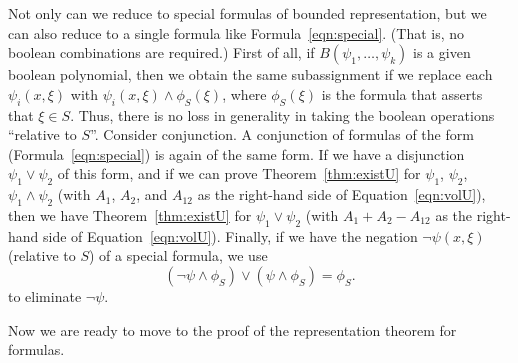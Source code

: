 \documentclass[11pt]{amsart}
\theoremstyle{definition}
\theoremstyle{remark}
\numberwithin{equation}{theorem}
\begin{document}
Not only can we reduce to special formulas of bounded
representation, but we can also reduce to a single formula like
Formula~\ref{eqn:special}.  (That is, no boolean combinations are
required.)  First of all, if $B(\psi_1,\ldots,\psi_k)$ is a given
boolean polynomial, then we obtain the same subassignment if we
replace each $\psi_i(x,\xi)$ with $\psi_i(x,\xi)\land
\phi_S(\xi)$, where $\phi_S(\xi)$ is the formula that asserts that
$\xi\in S$. Thus, there is no loss in generality in taking the
boolean operations ``relative to $S$''.  Consider conjunction.  A
conjunction of formulas of the form (Formula~\ref{eqn:special}) is
again of the same form. If we have a disjunction
$\psi_1\lor\psi_2$ of this form, and if we can prove
Theorem~\ref{thm:existU} for $\psi_1$, $\psi_2$,
$\psi_1\land\psi_2$ (with $A_1$, $A_2$, and $A_{12}$ as the
right-hand side of Equation~\ref{eqn:volU}), then we have
Theorem~\ref{thm:existU} for $\psi_1\lor\psi_2$ (with
$A_1+A_2-A_{12}$ as the right-hand side of
Equation~\ref{eqn:volU}). Finally, if we have the negation
$\lnot\psi(x,\xi)$ (relative to $S$) of a special formula, we use
    $$
    (\lnot\psi\land\phi_S)\lor(\psi\land\phi_S) = \phi_S.
    $$
to eliminate $\lnot\psi$.

Now we are ready to move to the proof of the representation
theorem for formulas.
\end{document}
